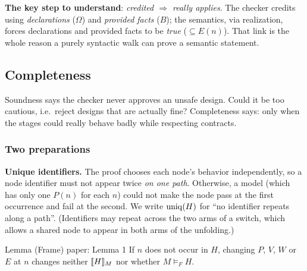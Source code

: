 \textbf{The key step to understand}: \emph{credited $\Rightarrow$ really applies}. The checker credits using \emph{declarations} ($\Omega$) and \emph{provided facts} ($B$); the semantics, via realization, forces declarations and provided facts to be \emph{true} ($\subseteq E(n)$). That link is the whole reason a purely syntactic walk can prove a semantic statement.


\subsection{Completeness}
\label{sec:complete}

Soundness says the checker never approves an unsafe design. Could it be too cautious, i.e.\ reject designs that are actually fine? Completeness says: only when the stages could really behave badly while respecting contracts.

\subsubsection{Two preparations}

\textbf{Unique identifiers.} The proof chooses each node's behavior independently, so a node identifier must not appear twice \emph{on one path}. Otherwise, a model (which has only one $P(n)$ for each $n$) could not make the node pass at the first occurrence and fail at the second. We write $\mathrm{uniq}(H)$ for ``no identifier repeats along a path''. (Identifiers may repeat across the two arms of a switch, which allows a shared node to appear in both arms of the unfolding.)

\begin{statement}{Lemma (Frame) \hfill\normalfont paper: Lemma 1}
If $n$ does not occur in $H$, changing $P$, $V$, $W$ or $E$ at $n$ changes neither $\llbracket H\rrbracket_{M}$ nor whether $M\models_F H$.
\end{statement}

